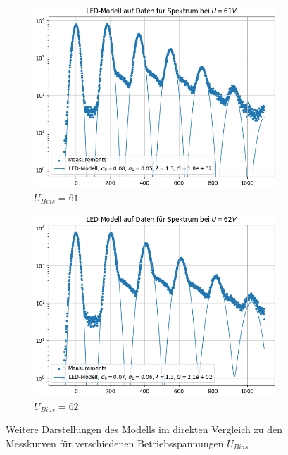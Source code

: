 \documentclass[12pt]{article}
\begin{document}
\begin{figure}[h!]
  \centering
  \begin{subfigure}{0.49\textwidth}
    \includegraphics[width=\textwidth]{Grafiken/modell 61}
    \caption{$U_{Bias}=61$}
  \end{subfigure}
  \begin{subfigure}{0.49\textwidth}
    \includegraphics[width=\textwidth]{Grafiken/modell 62}
    \caption{$U_{Bias}=62$}
  \end{subfigure}
  \caption{Weitere Darstellungen des Modells im direkten Vergleich zu den Messkurven für verschiedenen Betriebsspannungen $U_{Bias}$}
  \label{Modell3}
\end{figure}
\end{document}
